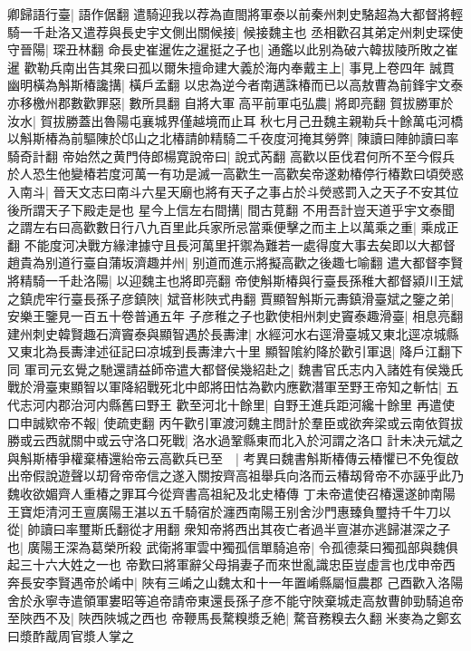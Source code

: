 卿歸語行臺|{
	語作倨翻}
遣騎迎我以荐為直閤將軍泰以前秦州刺史駱超為大都督將輕騎一千赴洛又遣荐與長史宇文側出關候接|{
	候接魏主也}
丞相歡召其弟定州刺史琛使守晉陽|{
	琛丑林翻}
命長史崔暹佐之暹挺之子也|{
	通鑑以此别為破六韓拔陵所敗之崔暹}
歡勒兵南出告其衆曰孤以爾朱擅命建大義於海内奉戴主上|{
	事見上卷四年}
誠貫幽明橫為斛斯椿讒搆|{
	橫戶孟翻}
以忠為逆今者南邁誅椿而已以高敖曹為前鋒宇文泰亦移檄州郡數歡罪惡|{
	數所具翻}
自將大軍高平前軍屯弘農|{
	將即亮翻}
賀拔勝軍於汝水|{
	賀拔勝蓋出魯陽屯襄城界僅越境而止耳}
秋七月己丑魏主親勒兵十餘萬屯河橋以斛斯椿為前驅陳於邙山之北椿請帥精騎二千夜度河掩其勞弊|{
	陳讀曰陣帥讀曰率騎奇計翻}
帝始然之黄門侍郎楊寛說帝曰|{
	說式芮翻}
高歡以臣伐君何所不至今假兵於人恐生他變椿若度河萬一有功是滅一高歡生一高歡矣帝遂勅椿停行椿歎曰頃熒惑入南斗|{
	晉天文志曰南斗六星天廟也將有天子之事占於斗熒惑罰入之天子不安其位後所謂天子下殿走是也}
星今上信左右間搆|{
	間古莧翻}
不用吾計豈天道乎宇文泰聞之謂左右曰高歡數日行八九百里此兵家所忌當乘便擊之而主上以萬乘之重|{
	乘成正翻}
不能度河决戰方緣津據守且長河萬里扞禦為難若一處得度大事去矣即以大都督趙貴為别道行臺自蒲坂濟趣并州|{
	别道而進示將擬高歡之後趣七喻翻}
遣大都督李賢將精騎一千赴洛陽|{
	以迎魏主也將即亮翻}
帝使斛斯椿與行臺長孫稚大都督潁川王斌之鎮虎牢行臺長孫子彦鎮陜|{
	斌音彬陜式冉翻}
賈顯智斛斯元夀鎮滑臺斌之鑒之弟|{
	安樂王鑒見一百五十卷普通五年}
子彦稚之子也歡使相州刺史竇泰趣滑臺|{
	相息亮翻}
建州刺史韓賢趣石濟竇泰與顯智遇於長夀津|{
	水經河水右逕滑臺城又東北逕凉城縣又東北為長夀津述征記曰凉城到長夀津六十里}
顯智隂約降於歡引軍退|{
	降戶江翻下同}
軍司元玄覺之馳還請益師帝遣大都督侯幾紹赴之|{
	魏書官氏志内入諸姓有侯幾氏}
戰於滑臺東顯智以軍降紹戰死北中郎將田怙為歡内應歡潛軍至野王帝知之斬怙|{
	五代志河内郡治河内縣舊曰野王}
歡至河北十餘里|{
	自野王進兵距河纔十餘里}
再遣使口申誠欵帝不報|{
	使疏吏翻}
丙午歡引軍渡河魏主問計於羣臣或欲奔梁或云南依賀拔勝或云西就關中或云守洛口死戰|{
	洛水過鞏縣東而北入於河謂之洛口}
計未决元斌之與斛斯椿爭權棄椿還紿帝云高歡兵已至　|{
	考異曰魏書斛斯椿傳云椿懼已不免復啟出帝假說遊聲以刧脅帝帝信之遂入關按齊高祖舉兵向洛而云椿刼脅帝不亦誣乎此乃魏收欲媚齊人重椿之罪耳今從齊書高祖紀及北史椿傳}
丁未帝遣使召椿還遂帥南陽王寶炬清河王亶廣陽王湛以五千騎宿於瀍西南陽王别舍沙門惠臻負璽持千牛刀以從|{
	帥讀曰率璽斯氏翻從才用翻}
衆知帝將西出其夜亡者過半亶湛亦逃歸湛深之子也|{
	廣陽王深為葛榮所殺}
武衛將軍雲中獨孤信單騎追帝|{
	令孤德棻曰獨孤部與魏俱起三十六大姓之一也}
帝歎曰將軍辭父母捐妻子而來世亂識忠臣豈虛言也戊申帝西奔長安李賢遇帝於崤中|{
	陜有三崤之山魏太和十一年置崤縣屬恒農郡}
己酉歡入洛陽舍於永寧寺遣領軍婁昭等追帝請帝東還長孫子彦不能守陜棄城走高敖曹帥勁騎追帝至陜西不及|{
	陜西陜城之西也}
帝鞭馬長騖糗漿乏絶|{
	騖音務糗去久翻米麥為之鄭玄曰漿酢酨周官漿人掌之}
